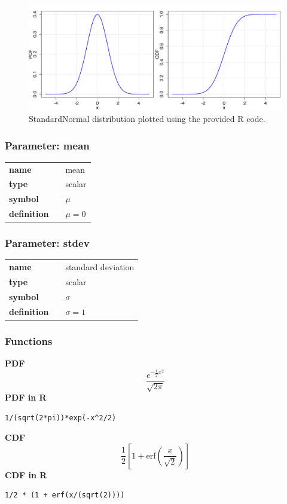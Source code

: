 \begin{figure}[ht!]
\centering
  \includegraphics[width=140mm]{pics/StandardNormal.pdf}
 \caption{StandardNormal distribution plotted using the provided R code.}
 \label{fig:StandardNormal}
\end{figure}

\subsubsection*{Parameter: mean}

\noindent\begin{tabular}{p{2cm}cl}
\textbf{name} & & mean \\
\textbf{type} & & scalar \\
\textbf{symbol} & & $\mu$  \\
\textbf{definition} & & $\mu=0$
\end{tabular}
\subsubsection*{Parameter: stdev}

\noindent\begin{tabular}{p{2cm}cl}
\textbf{name} & & standard deviation \\
\textbf{type} & & scalar \\
\textbf{symbol} & & $\sigma$  \\
\textbf{definition} & & $\sigma=1$
\end{tabular}
\subsubsection*{Functions}

\smallskip \noindent \hspace{.2cm} \textbf{PDF} 
\begin{equation*}\frac{e^{-\frac{1}{2} x^2}}{\sqrt{2\pi}}\end{equation*}
\smallskip \noindent \hspace{.2cm} \textbf{PDF in R}  
\begin{verbatim}1/(sqrt(2*pi))*exp(-x^2/2)\end{verbatim}
\smallskip \noindent \hspace{.2cm} \textbf{CDF} 
\begin{equation*}\frac12\left[1 + \text{erf}\left( \frac{x}{\sqrt{2}}\right)\right]\end{equation*}
\smallskip \noindent \hspace{.2cm} \textbf{CDF in R} 
\begin{verbatim}1/2 * (1 + erf(x/(sqrt(2))))\end{verbatim}
\smallskip
